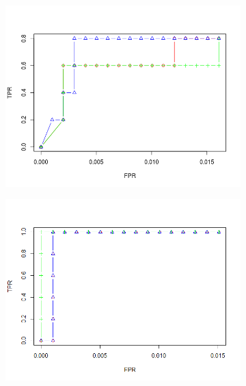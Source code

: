 \documentclass[11pt]{report}\usepackage[utf8]{inputenc}
\begin{document}
\begin{figure}[h]
\begin{subfigure}[b]{0.3\textwidth}
        \includegraphics[width=\textwidth]{../plots/general03}
        \caption{}
    \end{subfigure}
    \begin{subfigure}[b]{0.3\textwidth}
        \includegraphics[width=\textwidth]{../plots/100sample09}
        \caption{}
    \end{subfigure}
    \begin{subfigure}[b]{0.3\textwidth}

\end{subfigure}
\end{figure}
\end{document}
